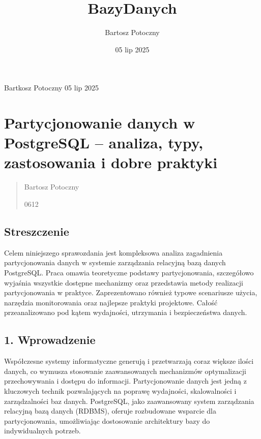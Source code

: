 \documentclass[a4paper,11pt,polish]{sphinxmanual}
\title{BazyDanych}
\date{05 lip 2025}
\author{Bartosz Potoczny}
\begin{document}
\pagestyle{empty}
\sphinxmaketitle
\pagestyle{plain}
\sphinxtableofcontents
\pagestyle{normal}
\label{\detokenize{index::doc}}


\sphinxAtStartPar
{} Bartkosz Potoczny
 05 lip 2025

\sphinxstepscope


\chapter{Partycjonowanie danych w PostgreSQL – analiza, typy, zastosowania i dobre praktyki}
\label{\detokenize{rozdzial_1:partycjonowanie-danych-w-postgresql-analiza-typy-zastosowania-i-dobre-praktyki}}\label{\detokenize{rozdzial_1::doc}}\begin{quote}\begin{description}
\sphinxAtStartPar
Bartosz Potoczny

\sphinxhyphen{}06\sphinxhyphen{}12

\end{description}\end{quote}


\section{Streszczenie}
\label{\detokenize{rozdzial_1:streszczenie}}
\sphinxAtStartPar
Celem niniejszego sprawozdania jest kompleksowa analiza zagadnienia partycjonowania danych w systemie zarządzania relacyjną bazą danych PostgreSQL. Praca omawia teoretyczne podstawy partycjonowania, szczegółowo wyjaśnia wszystkie dostępne mechanizmy oraz przedstawia metody realizacji partycjonowania w praktyce. Zaprezentowano również typowe scenariusze użycia, narzędzia monitorowania oraz najlepsze praktyki projektowe. Całość przeanalizowano pod kątem wydajności, utrzymania i bezpieczeństwa danych.


\section{1. Wprowadzenie}
\label{\detokenize{rozdzial_1:wprowadzenie}}
\sphinxAtStartPar
Współczesne systemy informatyczne generują i przetwarzają coraz większe ilości danych, co wymusza stosowanie zaawansowanych mechanizmów optymalizacji przechowywania i dostępu do informacji. Partycjonowanie danych jest jedną z kluczowych technik pozwalających na poprawę wydajności, skalowalności i zarządzalności baz danych. PostgreSQL, jako zaawansowany system zarządzania relacyjną bazą danych (RDBMS), oferuje rozbudowane wsparcie dla partycjonowania, umożliwiając dostosowanie architektury bazy do indywidualnych potrzeb.
\end{document}
